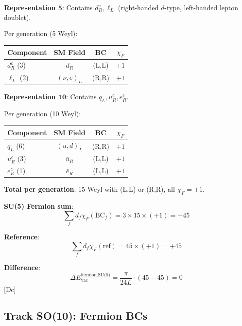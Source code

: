 \documentclass[11pt,a4paper]{article}
\newcommand{\tagDc}{\textcolor{blue!50!black}{[Dc]}}
\begin{document}
\begin{trackbox}
\textbf{Representation $\bar{\mathbf{5}}$}: Contains $d_R^c, \ell_L$ (right-handed $d$-type, left-handed lepton doublet).

Per generation (5 Weyl):
\begin{center}
\begin{tabular}{lccc}
\toprule
Component & SM Field & BC & $\chi_F$ \\
\midrule
$d_R^c$ (3) & $\bar{d}_R$ & (L,L) & $+1$ \\
$\ell_L$ (2) & $(\nu, e)_L$ & (R,R) & $+1$ \\
\bottomrule
\end{tabular}
\end{center}

\textbf{Representation $\mathbf{10}$}: Contains $q_L, u_R^c, e_R^c$.

Per generation (10 Weyl):
\begin{center}
\begin{tabular}{lccc}
\toprule
Component & SM Field & BC & $\chi_F$ \\
\midrule
$q_L$ (6) & $(u,d)_L$ & (R,R) & $+1$ \\
$u_R^c$ (3) & $\bar{u}_R$ & (L,L) & $+1$ \\
$e_R^c$ (1) & $\bar{e}_R$ & (L,L) & $+1$ \\
\bottomrule
\end{tabular}
\end{center}

\textbf{Total per generation}: 15 Weyl with (L,L) or (R,R), all $\chi_F = +1$.

\textbf{SU(5) Fermion sum}:
\begin{equation}
\label{eq:su5-ferm-sum}
\sum_f d_f \chi_F(\text{BC}_f) = 3 \times 15 \times (+1) = +45
\end{equation}

\textbf{Reference}:
\begin{equation}
\label{eq:su5-ferm-ref}
\sum_f d_f \chi_F(\text{ref}) = 45 \times (+1) = +45
\end{equation}

\textbf{Difference}:
\begin{equation}
\label{eq:su5-ferm-diff}
\Delta E_{\text{vac}}^{\text{fermion,SU(5)}} = \frac{\pi}{24L} \cdot (45 - 45) = 0
\end{equation}
\tagDc
\end{trackbox}

\subsection{Track SO(10): Fermion BCs}
\end{document}
